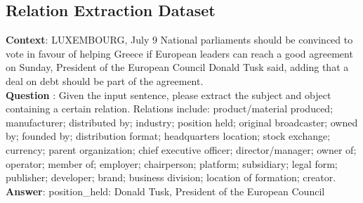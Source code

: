 \documentclass[logo,msc]{infthesis}           %
\begin{document}
\subsection{Relation Extraction Dataset}
\begin{tcolorbox}[colback=blue!5!white, %
                 colframe=gray, %
                 fonttitle=\bfseries, %
                 breakable, %
                 sharp corners, %
                 boxsep=10pt, %
                 left=10pt, %
                 right=10pt, %
                 top=10pt, %
                 bottom=10pt, %
                 enlarge left by=-10mm, %
                 enlarge right by=-10mm] %
\textbf{Context}: LUXEMBOURG, July 9 National parliaments should be convinced to vote in favour of helping Greece if European leaders can reach a good agreement on Sunday, President of the European Council Donald Tusk said, adding that a deal on debt should be part of the agreement. \\
\textbf{Question }: Given the input sentence, please extract the subject and object containing a certain relation. Relations include: product/material produced; manufacturer; distributed by; industry; position held; original broadcaster; owned by; founded by; distribution format; headquarters location; stock exchange; currency; parent organization; chief executive officer; director/manager; owner of; operator; member of; employer; chairperson; platform; subsidiary; legal form; publisher; developer; brand; business division; location of formation; creator. \\
\textbf{Answer}: position\_held: Donald Tusk, President of the European Council
\end{tcolorbox}
\end{document}
